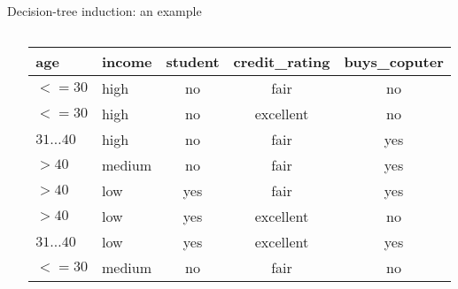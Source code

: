 \documentclass[aspectratio=169,t,table]{beamer}
\begin{document}
{\begin{frame}{Decision-tree induction: an example}
\begin{columns}
\begin{column}{0.4\textwidth}
\begin{itemize}
          \end{itemize}
        \end{column}
        \begin{column}{0.6\textwidth}
          \begin{tabular}{|l|l|c|c|c|}
            \hline
            \cellcolor{blue!20}age & \cellcolor{blue!20}income & \cellcolor{blue!20}student & \cellcolor{blue!20}credit\_rating & \cellcolor{blue!20}buys\_coputer \\\hline
            \cellcolor{yellow!20}$<=30$ & \cellcolor{yellow!20}high & \cellcolor{yellow!20}no & \cellcolor{yellow!20}fair & \cellcolor{red!20}no \\\hline
            \cellcolor{yellow!20}$<=30$ & \cellcolor{yellow!20}high & \cellcolor{yellow!20}no & \cellcolor{yellow!20}excellent & \cellcolor{red!20}no \\\hline
            \cellcolor{yellow!20}$31\ldots40$ & \cellcolor{yellow!20}high & \cellcolor{yellow!20}no & \cellcolor{yellow!20}fair & \cellcolor{green!20}yes \\\hline
            \cellcolor{yellow!20}$>40$ & \cellcolor{yellow!20}medium & \cellcolor{yellow!20}no & \cellcolor{yellow!20}fair & \cellcolor{green!20}yes \\\hline
            \cellcolor{yellow!20}$>40$ & \cellcolor{yellow!20}low & \cellcolor{yellow!20}yes & \cellcolor{yellow!20}fair & \cellcolor{green!20}yes \\\hline
            \cellcolor{yellow!20}$>40$ & \cellcolor{yellow!20}low & \cellcolor{yellow!20}yes & \cellcolor{yellow!20}excellent & \cellcolor{red!20}no \\\hline
            \cellcolor{yellow!20}$31\ldots40$ & \cellcolor{yellow!20}low & \cellcolor{yellow!20}yes & \cellcolor{yellow!20}excellent & \cellcolor{green!20}yes \\\hline
            \cellcolor{yellow!20}$<=30$ & \cellcolor{yellow!20}medium & \cellcolor{yellow!20}no & \cellcolor{yellow!20}fair & \cellcolor{red!20}no \\\hline

\end{tabular}
\end{column}
\end{columns}
\end{frame}}
\end{document}
